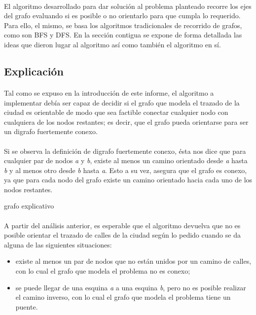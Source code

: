 \paragraph{}
El algoritmo desarrollado para dar solución al problema planteado recorre los ejes del grafo evaluando si es posible o no orientarlo para que cumpla lo requerido. Para ello, el mismo, se basa los algoritmos tradicionales de recorrido de grafos, como son BFS y DFS. En la sección contigua se expone de forma detallada las ideas que dieron lugar al algoritmo así como también el algoritmo en sí.

	
\subsection{Explicación}
\label{exp2}

\paragraph{}
Tal como se expuso en la introducción de este informe, el algoritmo a implementar debía ser capaz de decidir si el grafo que modela el trazado de la ciudad es orientable de modo que sea factible conectar cualquier nodo con cualquiera de los nodos restantes; es decir, que el grafo pueda orientarse para ser un digrafo fuertemente conexo.

\paragraph{}
Si se observa la definición de digrafo fuertemente conexo, ésta nos dice que para cualquier par de nodos \textit{a} y \textit{b}, existe al menos un camino orientado desde \textit{a} hasta \textit{b} y al menos otro desde \textit{b} hasta \textit{a}. Esto a su vez, asegura que el grafo es conexo, ya que para cada nodo del grafo existe un camino orientado hacia cada uno de los nodos restantes.

\begin{center}
grafo explicativo
\end{center}

\paragraph{}
A partir del análisis anterior, es esperable que el algoritmo devuelva que no es posible orientar el trazado de calles de la ciudad según lo pedido cuando se da alguna de las siguientes situaciones: 
\begin{itemize}
	\item existe al menos un par de nodos que no están unidos por un camino de calles, con lo cual el grafo que modela el problema no es conexo;
	\item se puede llegar de una esquina \textit{a} a una esquina \textit{b}, pero no es posible realizar el camino inverso, con lo cual el grafo que modela el problema tiene un puente.
\end{itemize}

